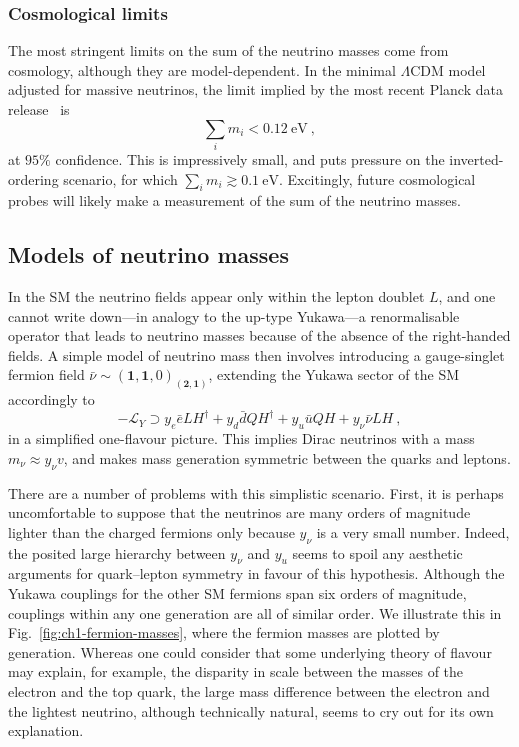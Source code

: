 \subsubsection{Cosmological limits}

The most stringent limits on the sum of the neutrino masses come from cosmology,
although they are model-dependent. In the minimal $\Lambda$CDM model adjusted
for massive neutrinos, the limit implied by the most recent Planck data
release~\cite{Aghanim:2018eyx} is
\begin{equation}
  \sum_{i} m_{i} < \SI{0.12}{\eV} \ ,
\end{equation}
at $95\%$ confidence. This is impressively small, and puts pressure on the
inverted-ordering scenario, for which $\sum_{i} m_{i} \gtrsim \SI{0.1}{\eV}$.
Excitingly, future cosmological probes will likely make a measurement of the sum
of the neutrino masses.

\subsection{Models of neutrino masses}
\label{sec:ch1-models-of-mv}

In the SM the neutrino fields appear only within the lepton doublet $L$, and one
cannot write down---in analogy to the up-type Yukawa---a renormalisable operator
that leads to neutrino masses because of the absence of the right-handed fields.
A simple model of neutrino mass then involves introducing a gauge-singlet
fermion field
$\bar{\nu} \sim (\mathbf{1}, \mathbf{1}, 0)_{(\mathbf{2}, \mathbf{1})}$,
extending the Yukawa sector of the SM accordingly to
\begin{equation}
  -\mathscr{L}_{Y} \supset y_{e}\bar{e}LH^{\dagger} + y_{d}\bar{d}QH^{\dagger} + y_{u} \bar{u}QH + y_{\nu}\bar{\nu}LH \ ,
\end{equation}
in a simplified one-flavour picture. This implies Dirac neutrinos with a mass
$m_{\nu} \approx y_{\nu} v$, and makes mass generation symmetric between the
quarks and leptons.

There are a number of problems with this simplistic scenario. First, it is
perhaps uncomfortable to suppose that the neutrinos are many orders of magnitude
lighter than the charged fermions only because $y_{\nu}$ is a very small number.
Indeed, the posited large hierarchy between $y_{\nu}$ and $y_{u}$ seems to spoil
any aesthetic arguments for quark--lepton symmetry in favour of this hypothesis.
Although the Yukawa couplings for the other SM fermions span six orders of
magnitude, couplings within any one generation are all of similar order. We
illustrate this in Fig.~\ref{fig:ch1-fermion-masses}, where the fermion masses are
plotted by generation. Whereas one could consider that some underlying theory of
flavour may explain, for example, the disparity in scale between the masses of
the electron and the top quark, the large mass difference between the electron
and the lightest neutrino, although technically natural, seems to cry out for
its own explanation.

